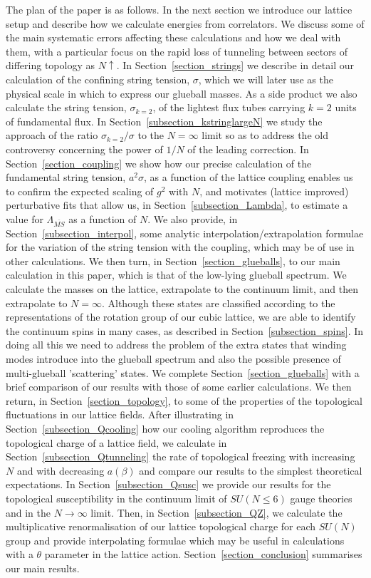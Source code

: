 \documentclass[12pt]{article}
\begin{document}
The plan of the paper is as follows. In the next section we introduce our lattice
setup and describe how we calculate energies from correlators. We discuss some of
the main systematic errors affecting these calculations and how we deal with them,
with a particular focus on the rapid loss of tunneling between sectors
of differing topology as $N\uparrow$. In Section~\ref{section_strings} we describe in 
detail our calculation
of the confining string tension, $\sigma$, which we will later use as the physical scale in
which to express our glueball masses. As a side product we also calculate the string tension, 
$\sigma_{k=2}$, of the lightest flux tubes carrying $k=2$ units of fundamental flux.
In Section~\ref{subsection_kstringlargeN} we study the approach
of the ratio $\sigma_{k=2}/\sigma$ to the $N=\infty$ limit so as to address the
old controversy concerning the power of  $1/N$ of the leading correction. In
Section~\ref{section_coupling} we show how our precise calculation of the fundamental 
string tension, $a^2\sigma$, as a function of the lattice coupling 
enables us to confirm the expected scaling of $g^2$ with $N$, and motivates 
(lattice improved) perturbative fits that allow us, in Section~\ref{subsection_Lambda}, 
to estimate a value for $\Lambda_{\overline{MS}}$ as a function of $N$. We also provide, 
in Section~\ref{subsection_interpol}, some analytic interpolation/extrapolation formulae 
for the variation of the string tension
with the coupling, which may be of use in other calculations.
We then turn, in Section~\ref{section_glueballs}, to our main
calculation in this paper, which is that of the low-lying glueball spectrum.
We calculate the masses on the lattice, extrapolate to the continuum limit, and
then extrapolate to $N=\infty$. Although these states are classified according to
the representations of the rotation group of our cubic lattice, we are able to
identify the continuum spins in many cases, as described in Section~\ref{subsection_spins}.
In doing all this we need to address the
problem of the extra states that winding modes introduce into the glueball spectrum and
also the possible presence of multi-glueball 'scattering' states.
We complete Section~\ref{section_glueballs} with a brief comparison of our results with
those of some earlier calculations. We then return,
in Section~\ref{section_topology}, to some of the properties of the topological
fluctuations in our lattice fields. After illustrating in Section~\ref{subsection_Qcooling}
how our cooling algorithm reproduces the topological charge of a lattice field, we
calculate in Section~\ref{subsection_Qtunneling} the rate of topological freezing with increasing
$N$ and with decreasing $a(\beta)$ and compare our results to the simplest theoretical expectations.
In Section~\ref{subsection_Qsusc} we provide our results for the topological
susceptibility in the continuum limit of $SU(N\leq 6)$ gauge theories and in the $N\to\infty$
limit. Then, in Section~\ref{subsection_QZ}, we calculate the multiplicative renormalisation of
our lattice topological charge for each $SU(N)$ group and provide interpolating formulae
which may be useful in calculations with a $\theta$ parameter in the lattice action.
Section~\ref{section_conclusion} summarises our main results. 
\end{document}
